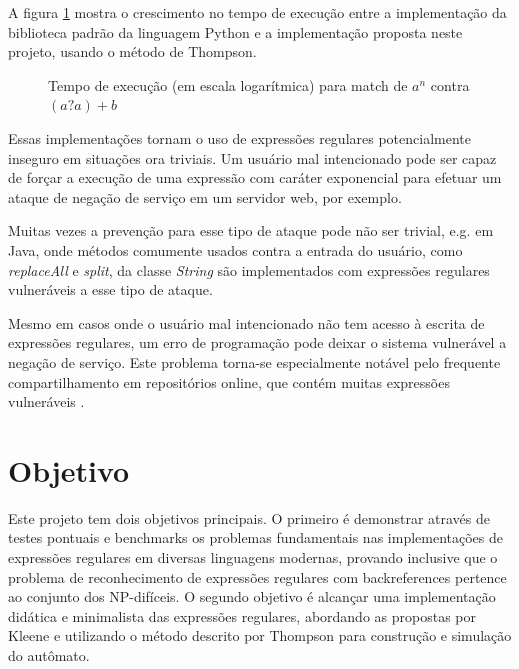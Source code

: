 \documentclass[a4paper,12pt,oneside,onecolumn]{uerj}
\begin{document}
A figura \ref{fig:benchmark1} mostra o crescimento no tempo de execução entre a implementação da biblioteca padrão da linguagem Python e a implementação proposta neste projeto, usando o método de Thompson. 

\begin{figure}[!htbp]
\centering
{}
\caption{Tempo de execução (em escala logarítmica) para match de $a^n$ contra $(a?a)+b$}
\label{fig:benchmark1}
\end{figure}

Essas implementações tornam o uso de expressões regulares potencialmente inseguro em situações ora triviais. Um usuário mal intencionado pode ser capaz de forçar a execução de uma expressão com caráter exponencial para efetuar um ataque de negação de serviço em um servidor web, por exemplo. 

Muitas vezes a prevenção para esse tipo de ataque pode não ser trivial, e.g. em Java, onde métodos comumente usados contra a entrada do usuário, como \emph{replaceAll} e \emph{split}, da classe \emph{String} são implementados com expressões regulares vulneráveis a esse tipo de ataque.

Mesmo em casos onde o usuário mal intencionado não tem acesso à escrita de expressões regulares, um erro de programação pode deixar o sistema vulnerável a negação de serviço. Este problema torna-se especialmente notável pelo frequente compartilhamento em repositórios online, que contém muitas expressões vulneráveis \cite{bib:Kirrage13,bib:Weidman10}. 

\section{Objetivo}

Este projeto tem dois objetivos principais. O primeiro é demonstrar através de testes pontuais e benchmarks os problemas fundamentais nas implementações de expressões regulares em diversas linguagens modernas, provando inclusive que o problema de reconhecimento de expressões regulares com backreferences pertence ao conjunto dos NP-difíceis. O segundo objetivo é alcançar uma implementação didática e minimalista das expressões regulares, abordando as propostas por Kleene e utilizando o método descrito por Thompson para construção e simulação do autômato.
\end{document}

